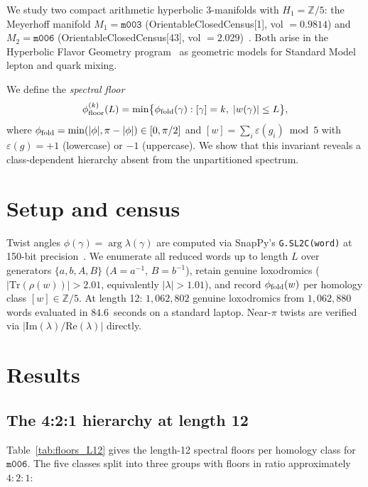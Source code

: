 \documentclass[11pt,a4paper]{article}
\theoremstyle{remark}
\newcommand{\mfld}[1]{\texttt{#1}}
\newcommand{\Zfive}{\mathbb{Z}/5}
\begin{document}
We study two compact arithmetic hyperbolic 3-manifolds with
$H_1=\Zfive$: the Meyerhoff manifold
$M_1 = \mfld{m003}$ (OrientableClosedCensus[1], vol $=0.9814$)
and $M_2 = \mfld{m006}$ (OrientableClosedCensus[43],
vol $=2.029$)~\cite{GMM,MaclachlanReid}.
Both arise in the Hyperbolic Flavor Geometry
program~\cite{GentryUnified} as geometric models for
Standard Model lepton and quark mixing.

We define the \emph{spectral floor}
\begin{equation}
\phi_{\rm floor}^{(k)}(L)
= \min\bigl\{\phi_{\rm fold}(\gamma) :
  [\gamma]=k,\; |w(\gamma)|\leq L\bigr\},
\end{equation}
where $\phi_{\rm fold}=\min(|\phi|,\pi-|\phi|)\in[0,\pi/2]$
and $[w]= \sum_i\varepsilon(g_i)\bmod 5$
with $\varepsilon(g)=+1$ (lowercase) or $-1$ (uppercase).
We show that this invariant reveals a class-dependent hierarchy
absent from the unpartitioned spectrum.

\section{Setup and census}
\label{sec:setup}

Twist angles $\phi(\gamma)=\arg\lambda(\gamma)$ are computed via
SnapPy's \texttt{G.SL2C(word)} at 150-bit precision~\cite{SnapPy}.
We enumerate all reduced words up to length $L$ over generators
$\{a,b,A,B\}$ ($A=a^{-1}$, $B=b^{-1}$), retain genuine
loxodromics ($|\mathrm{Tr}(\rho(w))|>2.01$, equivalently
$|\lambda|>1.01$), and record $\phi_{\rm fold}(w)$ per
homology class $[w]\in\Zfive$.
At length 12: $1{,}062{,}802$ genuine loxodromics from
$1{,}062{,}880$ words evaluated in $84.6$~seconds on a
standard laptop. Near-$\pi$ twists are verified via
$|\mathrm{Im}(\lambda)/\mathrm{Re}(\lambda)|$ directly.

\section{Results}
\label{sec:results}

\subsection{The 4:2:1 hierarchy at length 12}

Table~\ref{tab:floors_L12} gives the length-12 spectral floors
per homology class for $\mfld{m006}$.
The five classes split into three groups with floors in ratio
approximately $4{:}2{:}1$:
\end{document}
